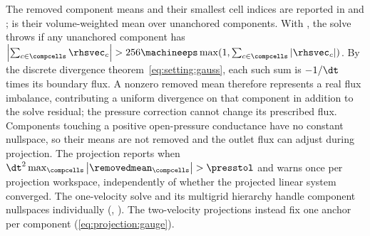 The removed component means and their smallest cell indices are reported in
 and
;  is their
volume-weighted mean over unanchored components. With
, the solve throws if any unanchored component has
$\abs{\sum_{c\in\compcells}\rhsvec_c}>256\machineeps\max(1,\sum_{c\in\compcells}\abs{\rhsvec_c})$.
By the discrete divergence theorem~\cref{eq:setting:gauss}, each such sum is
$-1/\dt$ times its boundary flux. A nonzero removed mean therefore represents
a real flux imbalance, contributing a uniform divergence on that component
in addition to the solve residual; the pressure correction cannot change
its prescribed flux. Components touching a positive open-pressure
conductance have no constant nullspace, so their means are not removed and
the outlet flux can adjust during projection.
The projection reports  when
$\dt^2\max_{\compcells}\abs{\removedmean_{\compcells}}>\presstol$ and warns
once per projection workspace, independently of whether the projected
linear system converged. The one-velocity solve and its multigrid hierarchy
handle component nullspaces individually (, ). The
two-velocity projections instead fix one anchor per component
(\cref{eq:projection:gauge}).

